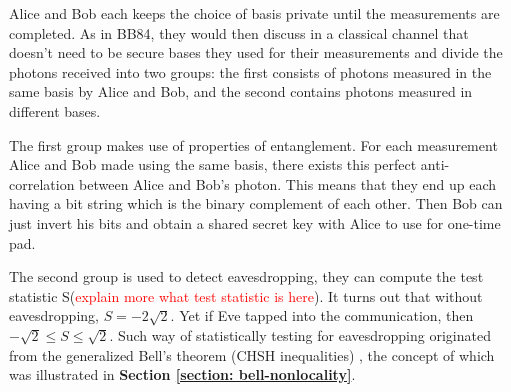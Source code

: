 Alice and Bob each keeps the choice of basis private until the measurements are completed. As in BB84, they would then discuss in a classical channel that doesn't need to be secure bases they used for their measurements and divide the photons received into two groups: the first consists of photons measured in the same basis by Alice and Bob, and the second contains photons measured in different bases. 

The first group makes use of properties of entanglement. For each measurement Alice and Bob made using the same basis, there exists this perfect anti-correlation between Alice and Bob's photon. This means that they end up each having a bit string which is the binary complement of each other. Then Bob can just invert his bits and obtain a shared secret key with Alice to use for one-time pad. 

The second group is used to detect eavesdropping, they can compute the test statistic S(\textcolor{red}{explain more what test statistic is here}). It turns out that without eavesdropping, $S=-2\sqrt{2}$. Yet if Eve tapped into the communication, then $-\sqrt{2} \le S \le \sqrt{2}$. Such way of statistically testing for eavesdropping originated from the generalized Bell's theorem (CHSH inequalities) \cite{bell1964}, the concept of which was illustrated in \textbf{Section \ref{section: bell-nonlocality}}.

